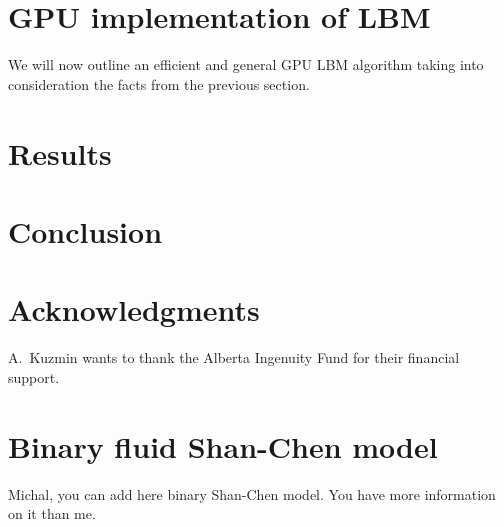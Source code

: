 \documentclass[mathpazo]{cicp}
\begin{document}
\section{GPU implementation of LBM}

We will now outline an efficient and general GPU LBM algorithm taking into consideration
the facts from the previous section.

\section{Results}
\label{sec:benchmark}

\section{Conclusion}
\section*{Acknowledgments}
A.~Kuzmin wants to thank the Alberta Ingenuity Fund for their financial support.

\appendix
\section{Binary fluid Shan-Chen model}
\label{sec:binary_shan_chen}
{\color{red} Michal, you can add here binary Shan-Chen model. You have more information on it than me.}
\end{document}
